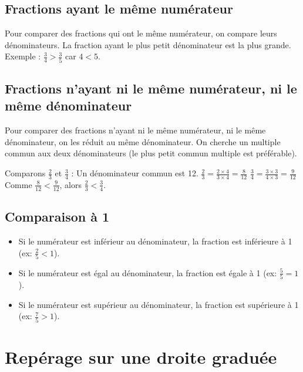 \subsection{Fractions ayant le même numérateur}
\begin{proprietebox}
  Pour comparer des fractions qui ont le même numérateur, on compare leurs dénominateurs. La fraction ayant le plus petit dénominateur est la plus grande.
  Exemple : $\frac{3}{4} > \frac{3}{5}$ car $4 < 5$.
\end{proprietebox}

\subsection{Fractions n'ayant ni le même numérateur, ni le même dénominateur}
\begin{methodebox}
  Pour comparer des fractions n'ayant ni le même numérateur, ni le même dénominateur, on les réduit au même dénominateur. On cherche un multiple commun aux deux dénominateurs (le plus petit commun multiple est préférable).
\end{methodebox}

\begin{examplebox}[Comparaison]
  Comparons $\frac{2}{3}$ et $\frac{3}{4}$ :
  Un dénominateur commun est 12.
  $\frac{2}{3} = \frac{2 \times 4}{3 \times 4} = \frac{8}{12}$
  $\frac{3}{4} = \frac{3 \times 3}{4 \times 3} = \frac{9}{12}$
  Comme $\frac{8}{12} < \frac{9}{12}$, alors $\frac{2}{3} < \frac{3}{4}$.
\end{examplebox}

\subsection{Comparaison à 1}
\begin{remarkbox}
  \begin{itemize}
    \item Si le numérateur est inférieur au dénominateur, la fraction est inférieure à 1 (ex: $\frac{2}{5} < 1$).
    \item Si le numérateur est égal au dénominateur, la fraction est égale à 1 (ex: $\frac{5}{5} = 1$).
    \item Si le numérateur est supérieur au dénominateur, la fraction est supérieure à 1 (ex: $\frac{7}{5} > 1$).
  \end{itemize}
\end{remarkbox}

\section{Repérage sur une droite graduée}

